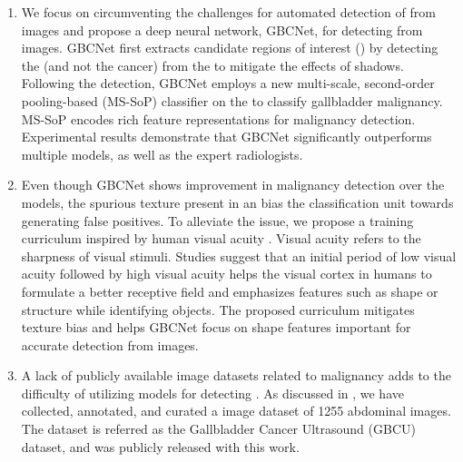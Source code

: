 \begin{enumerate}%
	\item We focus on circumventing the challenges for automated detection of \gbc from \usg images and propose a deep neural network, GBCNet, for detecting \gbc from \usg images. GBCNet first extracts candidate regions of interest (\rois) by detecting the \gb (and not the cancer) from the \usg to mitigate the effects of shadows. Following the \roi detection, GBCNet employs a new  multi-scale, second-order pooling-based (MS-SoP) classifier on the \rois to classify gallbladder malignancy. MS-SoP encodes rich feature representations for malignancy detection. Experimental results demonstrate that GBCNet significantly outperforms multiple \sota \cnn models, as well as the expert radiologists. 
	\item Even though GBCNet shows improvement in \gb malignancy detection over the \sota models, the spurious texture present in an \roi bias the classification unit towards generating false positives. To alleviate the issue, we propose a training curriculum inspired by human visual acuity \cite{kwon2016compensation, vogelsang2018VisualAcuity}. Visual acuity refers to the sharpness of visual stimuli. Studies suggest that an initial period of low visual acuity followed by high visual acuity helps the visual cortex in humans to formulate a better receptive field and emphasizes features such as shape or structure while identifying objects. 
	The proposed curriculum mitigates texture bias and helps GBCNet focus on shape features important for accurate \gbc detection from \usg images. %
	\item A lack of publicly available \usg image datasets related to \gb malignancy adds to the difficulty of utilizing \cnn models for detecting \gbc. As discussed in , we have collected, annotated, and curated a \usg image dataset of 1255 abdominal \usg images. The dataset is referred as the Gallbladder Cancer Ultrasound (GBCU) dataset, and was publicly released with this work.
\end{enumerate}


%
%


